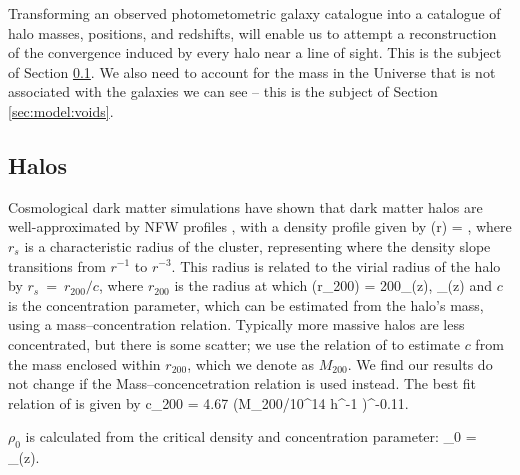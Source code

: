 \documentclass[useAMS,usenatbib]{mn2e}
\begin{document}
Transforming an observed photometometric galaxy catalogue into a 
catalogue of halo masses, positions, and redshifts, will enable us to
attempt a reconstruction of the convergence induced by every halo near a
line of sight. This is the subject of Section \ref{sec:model:halos}. We
also need to account for the mass in the Universe that is not associated
with the galaxies we can see -- this is the subject of Section
\ref{sec:model:voids}. 



\subsection{Halos}
\label{sec:model:halos}

Cosmological dark matter simulations have shown that dark matter
halos are well-approximated by NFW profiles \citep{NFW}, with a density
profile given by
\be\label{eq:rhonfw}
\rho(r) = 
,
\ee
where $r_{s}$ is a characteristic radius of the cluster, representing where
the density slope transitions from $r^{-1}$ to $r^{-3}$. This radius is related
to the virial radius of the halo by $r_{s}~=~r_{200}/c$, where $r_{200}$ is the radius at 
which 
\be
\rho(r_{200}) = 200\rho_{{}}(z),  \rho_{}(z) \equiv {}
\ee
and $c$ is the concentration parameter, which can be estimated from the halo's mass,
using a mass--concentration relation. Typically more massive halos are less concentrated,
but there is some scatter; we use the relation of \citet{Neto2007} to estimate $c$
from the mass enclosed within $r_{200}$, which we denote as $M_{200}$. We find our results do not change if the \citet{MaccioEtal2008} Mass--concencetration relation is used instead. The best fit relation of \citet{Neto2007} is given by
\be
c_{200} = 4.67 (M_{200}/10^{14} h^{-1} \Msun)^{-0.11}.
\ee

$\rho_0$ is calculated from the critical density and concentration parameter:
\be
\rho_0 = \rho_{}(z).
\ee
\end{document}
